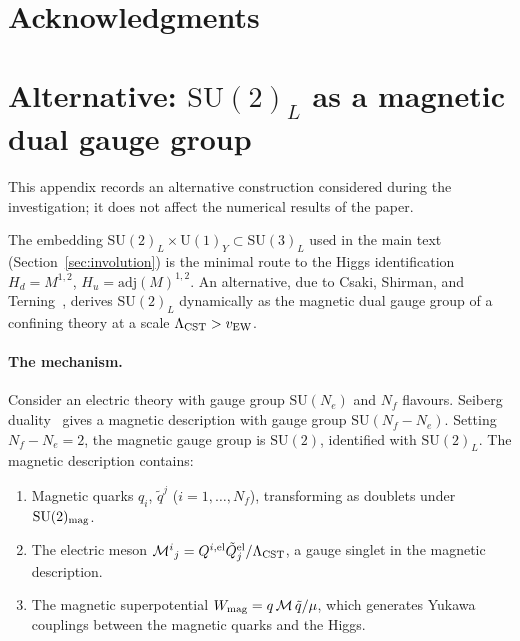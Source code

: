 \documentclass[12pt,a4paper]{article}
\newcommand{\SU}{\mathrm{SU}}
\newcommand{\UU}{\mathrm{U}}
\newcommand{\Nf}{N_f}
\newcommand{\adj}{\mathrm{adj}}
\begin{document}
\section*{Acknowledgments}



\appendix
\section{Alternative: $\SU(2)_L$ as a magnetic dual gauge group}
\label{app:CST}

This appendix records an alternative construction considered during
the investigation; it does not affect the numerical results of the
paper.

The embedding $\SU(2)_L \times \UU(1)_Y \subset \SU(3)_L$ used in
the main text (Section~\ref{sec:involution}) is the minimal route to
the Higgs identification $H_d = M^{1,2}$, $H_u = \adj(M)^{1,2}$.
An alternative, due to Csaki, Shirman, and
Terning~\cite{Csaki:2011xn}, derives $\SU(2)_L$ dynamically as the
magnetic dual gauge group of a confining theory at a scale
$\Lambda_{\rm CST} > v_{\rm EW}$.

\paragraph{The mechanism.}
Consider an electric theory with gauge group $\SU(N_e)$ and $\Nf$
flavours.  Seiberg duality~\cite{Seiberg:1994bz} gives a magnetic
description with gauge group $\SU(\Nf - N_e)$.  Setting
$\Nf - N_e = 2$, the magnetic gauge group is $\SU(2)$, identified
with $\SU(2)_L$.  The magnetic description contains:
\begin{enumerate}
  \item Magnetic quarks $q_i$, $\tilde{q}^j$ ($i = 1,\ldots,\Nf$),
    transforming as doublets under $\SU(2)_{\rm mag}$.
  \item The electric meson $\mathcal{M}^i{}_j =
    Q^{i,\rm el}\tilde{Q}^{\rm el}_j / \Lambda_{\rm CST}$,
    a gauge singlet in the magnetic description.
  \item The magnetic superpotential
    $W_{\rm mag} = q\,\mathcal{M}\,\tilde{q}/\mu$, which generates
    Yukawa couplings between the magnetic quarks and the Higgs.
\end{enumerate}
\end{document}
